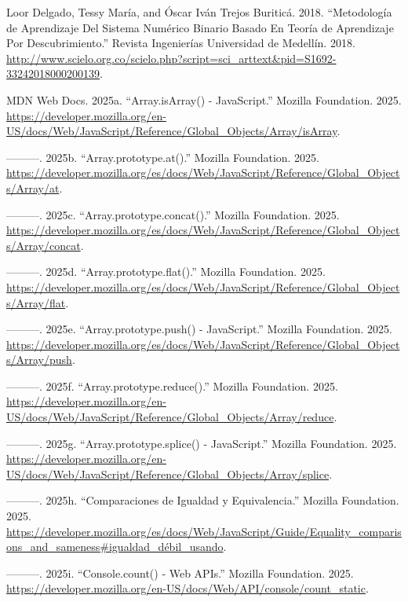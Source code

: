 \documentclass[
  letterpaper,
  DIV=11,
  numbers=noendperiod]{scrreprt}
\newlength{\cslhangindent}
\newenvironment{CSLReferences}[2] %
 {\begin{list}{}{%
  \setlength{\itemindent}{0pt}
  \setlength{\leftmargin}{0pt}
  \setlength{\parsep}{0pt}
  \ifodd #1
   \setlength{\leftmargin}{\cslhangindent}
   \setlength{\itemindent}{-1\cslhangindent}
  \fi
  \setlength{\itemsep}{#2\baselineskip}}}
 {\end{list}}
\begin{document}
\begin{CSLReferences}{1}{0}
Loor Delgado, Tessy María, and Óscar Iván Trejos Buriticá. 2018.
{``Metodología de Aprendizaje Del Sistema Numérico Binario Basado En
Teoría de Aprendizaje Por Descubrimiento.''} Revista Ingenierías
Universidad de Medellín. 2018.
\url{http://www.scielo.org.co/scielo.php?script=sci_arttext&pid=S1692-33242018000200139}.

MDN Web Docs. 2025a. {``Array.isArray() - JavaScript.''} Mozilla
Foundation. 2025.
\url{https://developer.mozilla.org/en-US/docs/Web/JavaScript/Reference/Global_Objects/Array/isArray}.

---------. 2025b. {``Array.prototype.at().''} Mozilla Foundation. 2025.
\url{https://developer.mozilla.org/es/docs/Web/JavaScript/Reference/Global_Objects/Array/at}.

---------. 2025c. {``Array.prototype.concat().''} Mozilla Foundation.
2025.
\url{https://developer.mozilla.org/es/docs/Web/JavaScript/Reference/Global_Objects/Array/concat}.

---------. 2025d. {``Array.prototype.flat().''} Mozilla Foundation.
2025.
\url{https://developer.mozilla.org/es/docs/Web/JavaScript/Reference/Global_Objects/Array/flat}.

---------. 2025e. {``Array.prototype.push() - JavaScript.''} Mozilla
Foundation. 2025.
\url{https://developer.mozilla.org/es/docs/Web/JavaScript/Reference/Global_Objects/Array/push}.

---------. 2025f. {``Array.prototype.reduce().''} Mozilla Foundation.
2025.
\url{https://developer.mozilla.org/en-US/docs/Web/JavaScript/Reference/Global_Objects/Array/reduce}.

---------. 2025g. {``Array.prototype.splice() - JavaScript.''} Mozilla
Foundation. 2025.
\url{https://developer.mozilla.org/en-US/docs/Web/JavaScript/Reference/Global_Objects/Array/splice}.

---------. 2025h. {``Comparaciones de Igualdad y Equivalencia.''}
Mozilla Foundation. 2025.
\url{https://developer.mozilla.org/es/docs/Web/JavaScript/Guide/Equality_comparisons_and_sameness\#igualdad_débil_usando}.

---------. 2025i. {``Console.count() - Web APIs.''} Mozilla Foundation.
2025.
\url{https://developer.mozilla.org/en-US/docs/Web/API/console/count_static}.


\end{CSLReferences}
\end{document}
